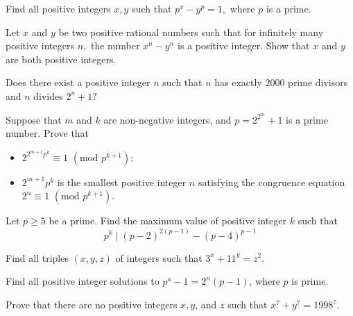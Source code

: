 \begin{problem}
	Find all positive integers $x,y$ such that $p^x - y^p=1,$ where $p$ is a prime.
\end{problem}



\begin{problem}
	Let $x$ and $y$ be two positive rational numbers such that for infinitely many positive integers $n,$ the number $x^n-y^n$ is a positive integer. Show that $x$ and $y$ are both positive integers.
\end{problem}

\begin{problem}[IMO 2000]
	Does there exist a positive integer $n$ such that $n$ has exactly $2000$ prime divisors and $n$ divides $2^n + 1?$
\end{problem}

\begin{problem}
	Suppose that $m$ and $k$ are non-negative integers, and $p = 2^{2^m}+1$ is a prime number. Prove that
	\begin{itemize}
		\item $2^{2^{m+1}p^k} \equiv 1$ $(\text{mod } p^{k+1})$;
		\item $2^{m+1}p^k$ is the smallest positive integer $n$ satisfying the congruence equation $2^n \equiv 1$ $(\text{mod } p^{k+1})$.
	\end{itemize}
\end{problem}

\begin{problem}
	Let $p \geq 5$ be a prime. Find the maximum value of positive integer $k$ such that
	\[p^{k}\mid(p-2)^{2(p-1)}-(p-4)^{p-1}\]
\end{problem}



\begin{problem} %
	Find all triples $(x,y,z)$ of integers such that $3^x+11^y=z^2$.
\end{problem}

\begin{problem} %
	Find all positive integer solutions to $p^a-1=2^n(p-1)$, where $p$ is prime.
\end{problem}

\begin{problem} %
	Prove that there are no positive integers $x,y$, and $z$ such that $x^7+y^7=1998^z$.
\end{problem}

